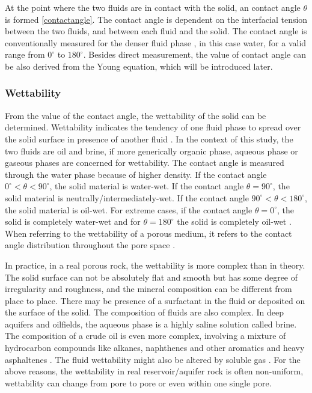 At the point where the two fluids are in contact with the solid, an contact angle $\theta$ is formed \ref{contactangle}. The contact angle is dependent on the interfacial tension between the two fluids, and between each fluid and the solid. The contact angle is conventionally measured for the denser fluid phase \citep{blunt2017multiphase}, in this case water, for a valid range from $0^{\circ}$ to $180^{\circ}$. Besides direct measurement, the value of contact angle can be also derived from the Young equation, which will be introduced later.

\subsubsection{Wettability}
From the value of the contact angle, the wettability of the solid can be determined. Wettability indicates the tendency of one fluid phase to spread over the solid surface in presence of another fluid \citep{craig1971reservoir}. In the context of this study, the two fluids are oil and brine, if more generically organic phase, aqueous phase or gaseous phases are concerned for wettability. The contact angle is measured through the water phase because of higher density. If the contact angle $0^{\circ}<\theta<90^{\circ}$, the solid material is water-wet. If the contact angle $\theta=90^{\circ}$, the solid material is neutrally/intermediately-wet. If the contact angle $90^{\circ}<\theta<180^{\circ}$, the solid material is oil-wet. For extreme cases, if the contact angle $\theta=0^{\circ}$, the solid is completely water-wet and for $\theta=180^{\circ}$ the solid is completely oil-wet \citep{blunt2017multiphase}. When referring to the wettability of a porous medium, it refers to the contact angle distribution throughout the pore space . 

In practice, in a real porous rock, the wettability is more complex than in theory. The solid surface can not be absolutely flat and smooth but has some degree of irregularity and roughness, and the mineral composition can be different from place to place. There may be presence of a surfactant in the fluid or deposited on the surface of the solid. The composition of fluids are also complex. In deep aquifers and oilfields, the aqueous phase is a highly saline solution called brine. The composition of a crude oil is even more complex, involving a mixture of hydrocarbon compounds like alkanes, naphthenes and other aromatics and heavy asphaltenes \citep{westlake1974biodegradability}. The fluid wettability might also be altered by soluble gas \citep{lee1974water}. For the above reasons, the wettability in real reservoir/aquifer rock is often non-uniform, wettability can change from pore to pore or even within one single pore.

